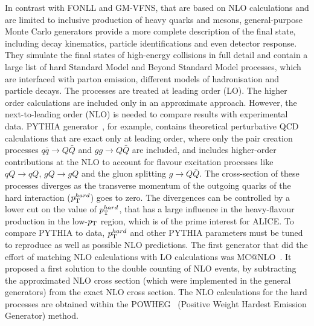 In contrast with FONLL and GM-VFNS, that are based on NLO calculations and are limited to inclusive production
of heavy quarks and mesons, general-purpose Monte Carlo generators provide a more complete description 
of the final state, including decay kinematics, particle identifications and even detector response. They simulate the 
final states of high-energy collisions in full detail and contain a large list of hard Standard Model and Beyond Standard Model processes, which are interfaced with parton emission, different models of hadronisation and particle decays. 
The processes are treated at leading order (LO). The higher order calculations are included only in an
approximate approach. However, the next-to-leading order (NLO) is needed to compare results with experimental data.
PYTHIA generator~\cite{Sjostrand:2006za}, for example, contains theoretical perturbative QCD calculations that are exact only
at leading order, where only the pair creation processes $q\bar{q} \rightarrow Q\bar{Q}$ and $gg \rightarrow Q\bar{Q}$
are included, and includes higher-order contributions at the NLO to account 
for flavour excitation processes like $qQ \rightarrow qQ$, $gQ \rightarrow gQ$
and the gluon splitting $g \rightarrow Q\bar{Q}$. The cross-section of these processes 
diverges as the transverse momentum of the outgoing quarks of the hard interaction ($p_{\rm T}^{hard}$) goes to zero. 
The divergences can be controlled by a lower cut 
on the value of  $p_{\rm T}^{hard}$, that has a large influence in the heavy-flavour production 
in the low-$p_{\rm T}$ region, which is of the prime interest for ALICE. To compare PYTHIA to data, $p_{\rm T}^{hard}$ and
other PYTHIA parameters must be tuned to reproduce as well as possible NLO predictions.
The first generator that did the effort of matching NLO calculations with LO calculations was MC@NLO~\cite{Frixione:2002ik}.
It proposed a first solution to the double counting of NLO events, by subtracting the approximated 
NLO cross section (which were implemented in the general generators) from the exact NLO cross section.
The NLO calculations for the hard processes are obtained within the POWHEG~\cite{Frixione:2007nw} (Positive Weight Hardest Emission Generator) method. 

